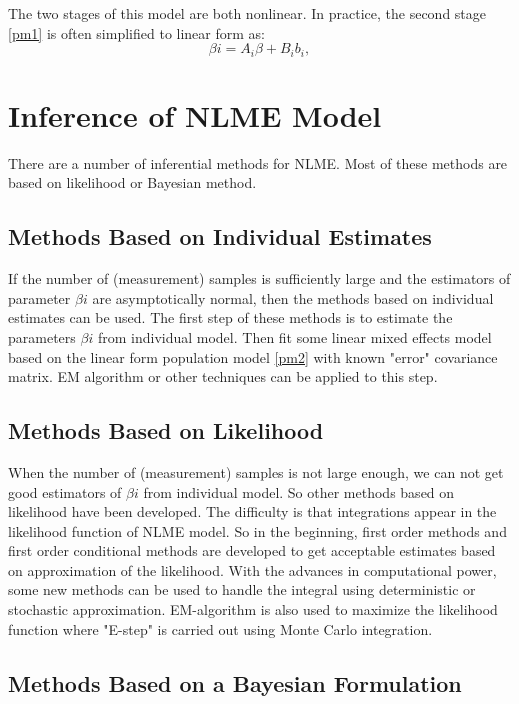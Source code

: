 \documentclass[12pt]{extarticle}
\begin{document}
The two stages of this model are both nonlinear. In practice, the second stage \eqref{pm1} is often simplified to linear form as:
\begin{equation}
\beta{i}=A_{i}\beta+B_{i}b_{i}, \label{pm2} 
\end{equation}

\section{Inference of NLME Model}
\label{sect:infer}
There are a number of inferential methods for NLME.  Most of these methods are based on likelihood or Bayesian method.

\subsection{Methods Based on Individual Estimates} 
\label{sect:ie}
If the number of (measurement) samples is sufficiently large and the estimators of parameter $\beta{i}$ are asymptotically normal, then the methods based on individual estimates can be used. The first step of these methods is to estimate the parameters $\beta{i}$ from individual model. Then fit some linear mixed effects model based on the linear form population model \eqref{pm2} with known "error" covariance matrix. EM algorithm or other techniques can be applied to this step.

\subsection{Methods Based on  Likelihood}
\label{sect:likelihood}
When the number of (measurement) samples is not large enough, we can not get good estimators of  $\beta{i}$ from individual model. So other methods based on likelihood have been developed. The difficulty is that integrations appear in the likelihood function of NLME model. So in the beginning, first order methods and first order conditional methods are developed to get acceptable estimates based on approximation of the likelihood. With the advances in computational power, some new methods can be used to handle the integral using deterministic or stochastic approximation. EM-algorithm is also used to maximize the likelihood function where "E-step" is carried out using Monte Carlo integration.

\subsection{Methods Based on a Bayesian Formulation}
\label{sect:bayesian}
\end{document}
